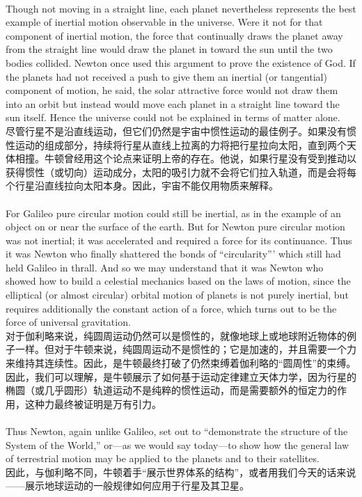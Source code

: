 \documentclass{article}
\begin{document}
\\
Though not moving in a straight line, each planet nevertheless represents the best example of inertial motion observable in the universe. Were it not for that component of inertial motion, the force that continually draws the planet away from the straight line would draw the planet in toward the sun until the two bodies collided. Newton once used this argument to prove the existence of God. If the planets had not received a push to give them an inertial (or tangential) component of motion, he said, the solar attractive force would not draw them into an orbit but instead would move each planet in a straight line toward the sun itself. Hence the universe could not be explained in terms of matter alone.\\
尽管行星不是沿直线运动，但它们仍然是宇宙中惯性运动的最佳例子。如果没有惯性运动的组成部分，持续将行星从直线上拉离的力将把行星拉向太阳，直到两个天体相撞。牛顿曾经用这个论点来证明上帝的存在。他说，如果行星没有受到推动以获得惯性（或切向）运动成分，太阳的吸引力就不会将它们拉入轨道，而是会将每个行星沿直线拉向太阳本身。因此，宇宙不能仅用物质来解释。\\

\\
For Galileo pure circular motion could still be inertial, as in the example of an object on or near the surface of the earth. But for Newton pure circular motion was not inertial; it was accelerated and required a force for its continuance. Thus it was Newton who finally shattered the bonds of ``circularity''' which still had held Galileo in thrall. And so we may understand that it was Newton who showed how to build a celestial mechanics based on the laws of motion, since the elliptical (or almost circular) orbital motion of planets is not purely inertial, but requires additionally the constant action of a force, which turns out to be the force of universal gravitation.\\
对于伽利略来说，纯圆周运动仍然可以是惯性的，就像地球上或地球附近物体的例子一样。但对于牛顿来说，纯圆周运动不是惯性的；它是加速的，并且需要一个力来维持其连续性。因此，是牛顿最终打破了仍然束缚着伽利略的“圆周性”的束缚。因此，我们可以理解，是牛顿展示了如何基于运动定律建立天体力学，因为行星的椭圆（或几乎圆形）轨道运动不是纯粹的惯性运动，而是需要额外的恒定力的作用，这种力最终被证明是万有引力。\\

\\
Thus Newton, again unlike Galileo, set out to ``demonstrate the structure of the System of the World,'' or—as we would say today—to show how the general law of terrestrial motion may be applied to the planets and to their satellites.\\
因此，与伽利略不同，牛顿着手“展示世界体系的结构”，或者用我们今天的话来说——展示地球运动的一般规律如何应用于行星及其卫星。\\
\end{document}
